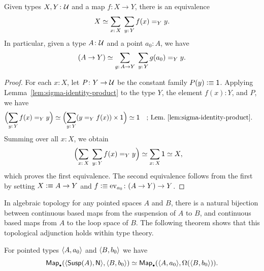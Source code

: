 \begin{lem}\label{lem:map-graph-equivalence}
    Given types\/ $X,Y\colon\univ$ and a map\/ $f\colon X\to Y$, there is an equivalence
    \[
        X\simeq\sum_{x\colon X}\;\sum_{y\colon Y}
            f(x)\eq Yy.
    \]
    In particular, given a type\/ $A\colon\univ$ and a point\/ $a_0\colon A$, we have
    \[
        (A\to Y)
            \simeq
                \sum_{g\colon A\to Y}\;
                \sum_{y\colon Y}
                g(a_0)\eq Yy.
    \]
\end{lem}

\begin{proof}
    For each $x\colon X$, let $P\colon Y\to\univ$ be the constant family $P(y)\mathrel{\vcentcolon}\equiv\mathsf{1}$. Applying Lemma~\ref{lem:sigma-identity-product} to the type $Y$, the element $f(x)\colon Y$, and $P$, we have
    \begin{align*}
        \Bigl(
            \sum_{y\colon Y}f(x)\eq Yy
        \Bigr)
        &\simeq
        \Bigl(
            \sum_{y\colon Y}(y\eq Yf(x))\times\fun1
        \Bigr)
        \simeq
        \fun1
        &&\text{; Lem.~\ref{lem:sigma-identity-product}}.
    \end{align*}
    Summing over all $x\colon X$, we obtain
    \begin{align*}
        \Bigl(
            \sum_{x\colon X}\;
            \sum_{y\colon Y}f(x)\eq Yy
        \Bigr)
        &\simeq
        \sum_{x\colon X}\fun1
        \simeq X,
    \end{align*}
    which proves the first equivalence. The second equivalence follows from the first by setting $X\mathrel{\vcentcolon}\equiv A\to Y$ and $f\defeq\ev{a_0}\colon(A\to Y)\to Y$.
\end{proof}

\begin{rem}
    In algebraic topology for any pointed spaces $A$ and $B$, there is a natural bijection between continuous based maps from the suspension of $A$ to $B$, and continuous based maps from $A$ to the loop space of $B$. The following theorem shows that this topological adjunction holds within type theory.
\end{rem}

\begin{thm}\label{thm:Susp-adjunction}
    For pointed types\/ $\langle A,a_0\rangle$ and\/ $\langle B,b_0\rangle$ we have
    \[
        \fun{Map}_\sbull(\dep{\fun{Susp}(A),\fun N},\dep{B,b_0})
            \simeq\fun{Map}_\sbull(
                \dep{A,a_0},
                \Omega(\dep{B,b_0})
            ).
    \]
\end{thm}

